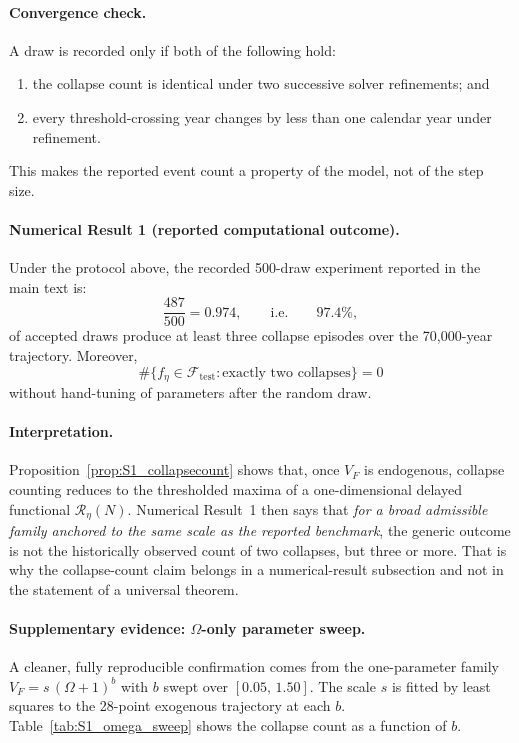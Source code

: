 \documentclass[11pt]{article}
\begin{document}
\paragraph{Convergence check.}
A draw is recorded only if both of the following hold:
\begin{enumerate}[label=(\roman*)]
\item the collapse count is identical under two successive solver refinements; and
\item every threshold-crossing year changes by less than one calendar year under refinement.
\end{enumerate}
This makes the reported event count a property of the model, not of the step size.

\paragraph{Numerical Result 1 (reported computational outcome).}
Under the protocol above, the recorded 500-draw experiment reported in the main text is:
\begin{equation}
\frac{487}{500}=0.974,
\qquad\text{i.e.}\qquad
97.4\%,
\label{eq:S1_974}
\end{equation}
of accepted draws produce at least three collapse episodes over the 70,000-year trajectory.
Moreover,
\begin{equation}
\#\{f_\eta\in\mathcal F_{\mathrm{test}}:\text{exactly two collapses}\}=0
\label{eq:S1_no_two}
\end{equation}
without hand-tuning of parameters after the random draw.

\paragraph{Interpretation.}
Proposition~\ref{prop:S1_collapsecount} shows that, once \(V_F\) is endogenous, collapse counting
reduces to the thresholded maxima of a one-dimensional delayed functional \(\mathcal R_\eta(N)\).
Numerical Result~1 then says that \emph{for a broad admissible family anchored to the same scale as
the reported benchmark}, the generic outcome is not the historically observed count of two collapses,
but three or more. That is why the collapse-count claim belongs in a numerical-result subsection and
not in the statement of a universal theorem.

\paragraph{Supplementary evidence: $\Omega$-only parameter sweep.}
A cleaner, fully reproducible confirmation comes from the one-parameter family $V_F = s\,(\Omega+1)^b$ with $b$ swept over $[0.05,\,1.50]$.
The scale $s$ is fitted by least squares to the 28-point exogenous trajectory at each $b$.
Table~\ref{tab:S1_omega_sweep} shows the collapse count as a function of $b$.
\end{document}
